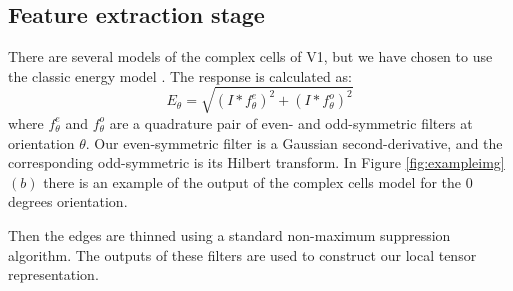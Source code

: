 \documentclass{llncs}
\begin{document}
\subsection{Feature extraction stage}
\label{sec:ass_feature}
There are several models of the complex cells of V1, but we have chosen to
use the classic energy model \cite{Morrone88}.
The response is calculated as:
\begin{equation} \label{eqn:nrgmod}
E_\theta=\sqrt{\left(I*f^{e}_\theta \right)^2+\left(I*f^{o}_\theta \right)^2}
\end{equation}
where $f^{e}_\theta$ and $f^{o}_\theta$ are a quadrature pair of even- and
odd-symmetric filters at orientation $\theta$. Our even-symmetric filter is
a Gaussian second-derivative, and the corresponding odd-symmetric is its
Hilbert transform.
In Figure \ref{fig:exampleimg} $(b)$ there is an example of the output of the
complex cells model for the $0$ degrees orientation.

Then the edges are thinned using a standard non-maximum
suppression algorithm.
The outputs of these filters are used to construct our local tensor
representation.




\end{document}
